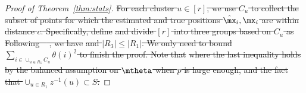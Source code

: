 \documentclass[lettersize,onecolumn,journal]{IEEEtran}
\theoremstyle{definition}
\theoremstyle{definition}
\providecommand{\DIFdeltex}[1]{{\protect\color{red}\sout{#1}}}                      %
\providecommand{\DIFdel}[1]{\texorpdfstring{\DIFdeltex{#1}}{}} %
\begin{document}
\begin{proof}[Proof of Theorem~\ref{thm:stats}]
\DIFdel{For each cluster $u\in[r]$, we use $C_u$ to collect the subset of points for which the estimated and true positions $\hat \mx_i, \mx_i$ are within distance $c$. Specifically, define
}%
\DIFdel{and divide $[r]$ into three groups based on $C_u$ as 
}%
\DIFdel{Following \mbox{%
\citet[Lemma 6]{gao2018community}}\hspace{0pt}%
, we have 
}%
\DIFdel{and $|R_3| \leq |R_1|$. We only need to bound $\sum_{ i \in \cup_{u \in R_3} C_u} \theta(i)^2$ to finish the proof. Note that 
}%
\DIFdel{where the last inequality holds by the balanced assumption on $\mtheta$ when $p$ is large enough, and the fact that $ \cup_{u \in R_1} z^{-1}(u) \subset S$.
}%


\end{proof}
\end{document}
